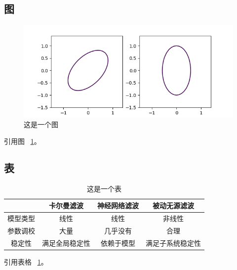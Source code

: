\documentclass[a4paper, 12pt]{article}
\begin{document}
\subsection{图}
\begin{figure}[ht]
    \centering
    \includegraphics[width = \textwidth]{example.png}
    \caption{这是一个图}
    \label{fig: fig1}
\end{figure}

引用图 ~\ref{fig: fig1}。

\subsection{表}
\begin{table}[ht] %
    \caption{这是一个表}
    \label{tb: filter}
    \centering
    \begin{tabular}{cccc} %
        \hline
        & 卡尔曼滤波 & 神经网络滤波 & 被动无源滤波 \\ 
        \hline
        模型类型 & 线性 & 线性 & 非线性 \\ 
        参数调校 & 大量 & 几乎没有 & 合理 \\ 
        稳定性 & 满足全局稳定性 & 依赖于模型 & 满足子系统稳定性 \\ 
        \hline
    \end{tabular} 
\end{table}

引用表格 ~\ref{tb: filter}。




\end{document}
